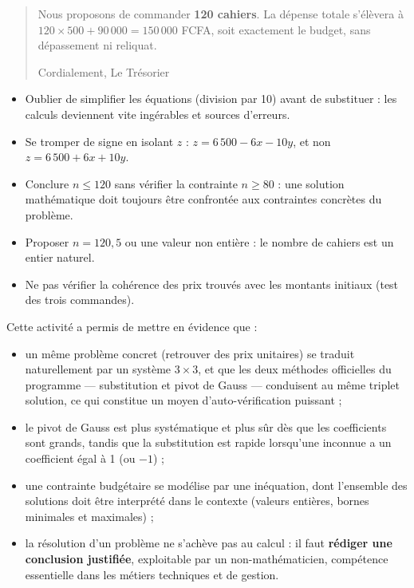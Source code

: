 \documentclass[11pt]{article}
\newcommand{\cle}[1]{{\popxbold\color{popdark}#1}}
\newcounter{popsec}
\newcounter{popsub}
\newcommand{\courssub}[1]{%
  \stepcounter{popsub}%
  \par\vspace{9pt}\noindent{\popxbold\fontsize{11.5}{13}\selectfont\color{popink}{\color{poporange}\thepopsec.\thepopsub}\hspace{6pt}#1}\par\nopagebreak\vspace{4pt}
}
\begin{document}
\begin{exoresolu}
\begin{quote}
Nous proposons de commander \textbf{120 cahiers}. La dépense totale s'élèvera à $120 \times 500 + 90\,000 = 150\,000$ FCFA, soit exactement le budget, sans dépassement ni reliquat.

Cordialement, \hfill Le Trésorier
\end{quote}
\end{exoresolu}

\begin{attention}
\begin{itemize}
\item Oublier de simplifier les équations (division par 10) avant de substituer : les calculs deviennent vite ingérables et sources d'erreurs.
\item Se tromper de signe en isolant $z$ : $z = 6\,500 - 6x - 10y$, et non $z = 6\,500 + 6x + 10y$.
\item Conclure $n \le 120$ sans vérifier la contrainte $n \ge 80$ : une solution mathématique doit toujours être confrontée aux contraintes concrètes du problème.
\item Proposer $n = 120{,}5$ ou une valeur non entière : le nombre de cahiers est un entier naturel.
\item Ne pas vérifier la cohérence des prix trouvés avec les montants initiaux (test des trois commandes).
\end{itemize}
\end{attention}

\courssub{Bilan de l'activité}

Cette activité a permis de mettre en évidence que :
\begin{itemize}
\item un même problème concret (retrouver des prix unitaires) se traduit naturellement par un système $3\times 3$, et que les deux méthodes officielles du programme — \cle{substitution} et \cle{pivot de Gauss} — conduisent au même triplet solution, ce qui constitue un moyen d'auto-vérification puissant ;
\item le pivot de Gauss est plus systématique et plus sûr dès que les coefficients sont grands, tandis que la substitution est rapide lorsqu'une inconnue a un coefficient égal à 1 (ou $-1$) ;
\item une contrainte budgétaire se modélise par une \cle{inéquation}, dont l'ensemble des solutions doit être interprété dans le contexte (valeurs entières, bornes minimales et maximales) ;
\item la résolution d'un problème ne s'achève pas au calcul : il faut \textbf{rédiger une conclusion justifiée}, exploitable par un non-mathématicien, compétence essentielle dans les métiers techniques et de gestion.
\end{itemize}
\end{document}
